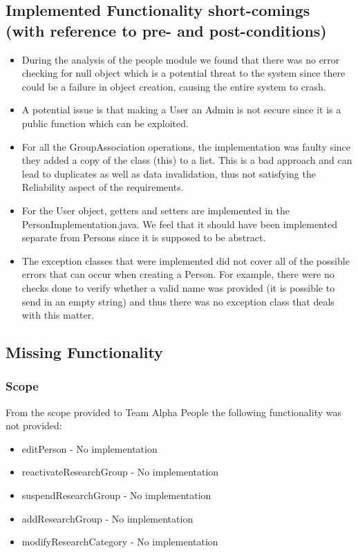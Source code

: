 \documentclass{article}
\begin{document}
    \subsection{Implemented Functionality short-comings (with reference to pre- and post-conditions)}
	\begin{itemize}
	
	    \item During the analysis of the people module we found that there was no error checking for null object which is a potential threat to the system since there could be a failure in object creation, causing the entire system to crash.
	    \item A potential issue is that making a User an Admin is not secure since it is a public function which can be exploited.
	    \item For all the GroupAssociation operations, the implementation was faulty since they added a copy of the class (this) to a list. This is a bad approach and can lead to duplicates as well as data invalidation, thus not satisfying the Reliability aspect of the requirements.
	    \item For the User object, getters and setters are implemented in the PersonImplementation.java. We feel that it should have been implemented separate from Persons since it is supposed to be abstract. 
	    \item The exception classes that were implemented did not cover all of the possible errors that can occur when creating a Person. For example, there were no checks done to verify whether a valid name was provided (it is possible to send in an empty string) and thus there was no exception class that deals with this matter.
	\end{itemize}

    \subsection{Missing Functionality}
	\subsubsection{Scope}
	From the scope provided to Team Alpha People the following functionality was not provided:
	\begin{itemize}
		\item editPerson - No implementation
		\item reactivateResearchGroup - No implementation
		\item suspendResearchGroup - No implementation
		\item addResearchGroup - No implementation
		\item modifyResearchCategory - No implementation
	\end{itemize}
	
\end{document}
